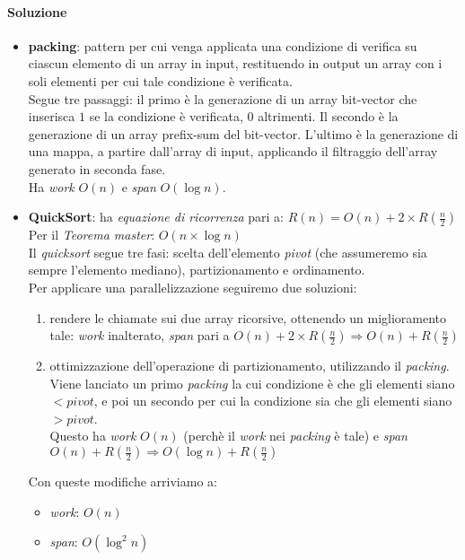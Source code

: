 \paragraph{Soluzione}
\begin{itemize}
	\item \textbf{packing}: pattern per cui venga applicata una condizione di verifica su ciascun elemento di un array in input, restituendo in output un array con i soli elementi per cui tale condizione è verificata. \\
	Segue tre passaggi: il primo è la generazione di un array bit-vector che inserisca $1$ se la condizione \`e verificata, $0$ altrimenti. Il secondo è la generazione di un array prefix-sum del bit-vector. L'ultimo è la generazione di una mappa, a partire dall'array di input, applicando il filtraggio dell'array generato in seconda fase. \\
	Ha \textit{work} $O(n)$ e \textit{span} $O(\log n)$.
	\item \textbf{QuickSort}: ha \textit{equazione di ricorrenza} pari a: $R(n) = O(n) + 2\times R(\frac{n}{2})$ \\
	Per il \textit{Teorema master}: $O(n\times \log n)$ \\
	Il \textit{quicksort} segue tre fasi: scelta dell'elemento \textit{pivot} (che assumeremo sia sempre l'elemento mediano), partizionamento e ordinamento. \\
	Per applicare una parallelizzazione seguiremo due soluzioni:
	\begin{enumerate}
		\item rendere le chiamate sui due array ricorsive, ottenendo un miglioramento tale: \textit{work} inalterato, \textit{span} pari a $O(n) + 2\times R(\frac{n}{2}) \Rightarrow O(n) + R(\frac{n}{2})$
		\item ottimizzazione dell'operazione di partizionamento, utilizzando il \textit{packing}. Viene lanciato un primo \textit{packing} la cui condizione \`e che gli elementi siano $< pivot$, e poi un secondo per cui la condizione sia che gli elementi siano $> pivot$. \\
		Questo ha \textit{work} $O(n)$ (perch\`e il \textit{work} nei \textit{packing} \`e tale) e \textit{span} $O(n) + R(\frac{n}{2}) \Rightarrow O(\log n) + R(\frac{n}{2})$
	\end{enumerate}
	Con queste modifiche arriviamo a:
	\begin{itemize}
		\item \textit{work}: $O(n)$
		\item \textit{span}: $O(\log^2 n)$
	\end{itemize}
\end{itemize}

